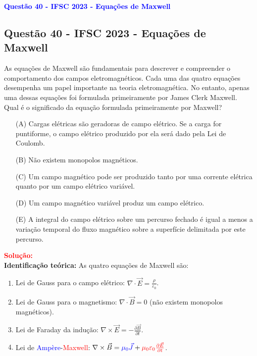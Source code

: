 \begin{flushleft}
\textbf{\textcolor{blue}{\Large Quest\~ao 40 - IFSC 2023 - Equa\c{c}\~oes de Maxwell}}\\
\noindent

\subsection{Quest\~ao 40 - IFSC 2023 - Equa\c{c}\~oes de Maxwell}
As equa\c{c}\~oes de Maxwell s\~ao fundamentais para descrever e compreender o comportamento dos campos eletromagn\'eticos. Cada uma das quatro equa\c{c}\~oes desempenha um papel importante na teoria eletromagn\'etica. No entanto, apenas uma dessas equa\c{c}\~oes foi formulada primeiramente por James Clerk Maxwell. Qual \'e o significado da equa\c{c}\~ao formulada primeiramente por Maxwell?

\begin{itemize}
    \item[(A)] Cargas el\'etricas s\~ao geradoras de campo el\'etrico. Se a carga for puntiforme, o campo el\'etrico produzido por ela ser\'a dado pela Lei de Coulomb.
    \item[(B)] N\~ao existem monopolos magn\'eticos.
    \item[(C)] Um campo magn\'etico pode ser produzido tanto por uma corrente el\'etrica quanto por um campo el\'etrico vari\'avel.
    \item[(D)] Um campo magn\'etico vari\'avel produz um campo el\'etrico.
    \item[(E)] A integral do campo el\'etrico sobre um percurso fechado \'e igual a menos a varia\c{c}\~ao temporal do fluxo magn\'etico sobre a superf\'icie delimitada por este percurso.
\end{itemize}

\vspace{0.5cm}
\textcolor{red}{\textbf{Solu\c{c}\~ao:}}\\

\textbf{Identifica\c{c}\~ao te\'orica:}  
As quatro equa\c{c}\~oes de Maxwell s\~ao:
\begin{enumerate}
    \item Lei de Gauss para o campo el\'etrico: $\nabla \cdot \vec{E} = \frac{\rho}{\varepsilon_0}$.
    \item Lei de Gauss para o magnetismo: $\nabla \cdot \vec{B} = 0$ (n\~ao existem monopolos magn\'eticos).
    \item Lei de Faraday da indu\c{c}\~ao: $\nabla \times \vec{E} = -\frac{\partial \vec{B}}{\partial t}$.
    \item Lei de \textcolor{blue}{Amp\`ere}-\textcolor{red}{Maxwell}: $\nabla \times \vec{B} = \textcolor{blue}{\mu_0 \vec{J}} + \textcolor{red}{\mu_0 \varepsilon_0 \frac{\partial \vec{E}}{\partial t}}$.
\end{enumerate}


\end{flushleft}
